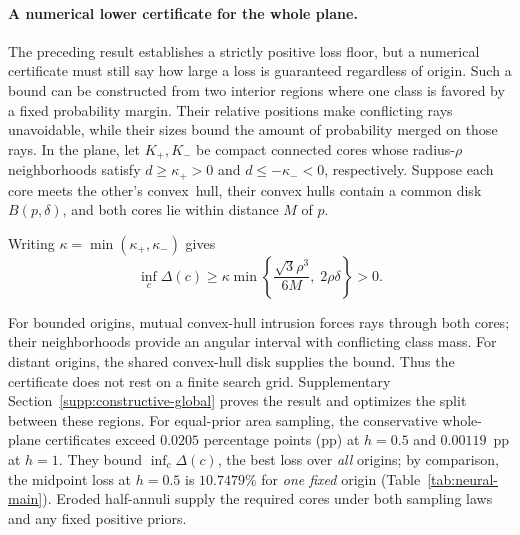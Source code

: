 \paragraph{A numerical lower certificate for the whole plane.}
The preceding result establishes a strictly positive loss floor, but a numerical certificate must still say how large a loss is guaranteed regardless of origin. Such a bound can be constructed from two interior regions where one class is favored by a fixed probability margin. Their relative positions make conflicting rays unavoidable, while their sizes bound the amount of probability merged on those rays. In the plane, let $K_+,K_-$ be compact connected cores whose radius-$\rho$ neighborhoods satisfy $d\geq\kappa_+>0$ and $d\leq-\kappa_-<0$, respectively. Suppose each core meets the other's \mbox{convex hull}, their convex hulls contain a common disk $B(p,\delta)$, and both cores lie within distance $M$ of $p$.
\par\begin{samepage}
\noindent Writing $\kappa=\min(\kappa_+,\kappa_-)$ gives
\begin{equation}
 \inf_c\Delta(c)\geq\kappa\min\left\{
 \frac{\sqrt3\rho^3}{6M},\;2\rho\delta\right\}>0.
 \label{eq:constructive-global}
\end{equation}
\end{samepage}
For bounded origins, mutual convex-hull intrusion forces rays through both cores; their neighborhoods provide an angular interval with conflicting class mass. For distant origins, the shared convex-hull disk supplies the bound. Thus the certificate does not rest on a finite search grid. Supplementary Section~\ref{supp:constructive-global} proves the result and optimizes the split between these regions. For equal-prior area sampling, the conservative whole-plane certificates exceed $0.0205$ percentage points (pp) at $h=0.5$ and $0.00119$~pp at $h=1$. They bound $\inf_c\Delta(c)$, the best loss over \emph{all} origins; by comparison, the midpoint loss at $h=0.5$ is $10.7479\%$ for \emph{one fixed} origin (Table~\ref{tab:neural-main}). Eroded half-annuli supply the required cores under both sampling laws and any fixed positive priors.

